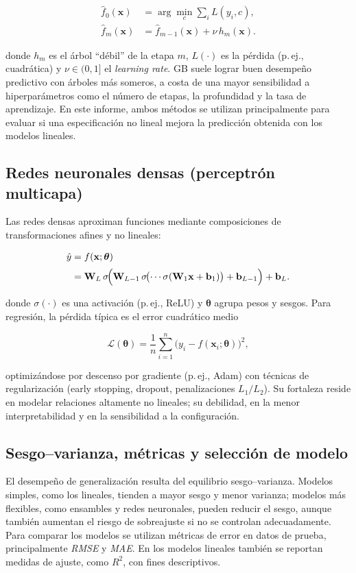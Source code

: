 \documentclass[10pt]{article}
\begin{document}
	\begin{align}
		\hat{f}_0(\mathbf{x}) &=
		\arg\min_c \sum_i L(y_i,c), \\[2pt]
		\hat{f}_m(\mathbf{x}) &=
		\hat{f}_{m-1}(\mathbf{x})
		+ \nu \, h_m(\mathbf{x}).
	\end{align}


	donde $h_m$ es el árbol ``débil'' de la etapa $m$, $L(\cdot)$ es la pérdida (p.\,ej., cuadrática) y $\nu\in(0,1]$ el \textit{learning rate}. GB suele lograr buen desempeño predictivo con árboles más someros, a costa de una mayor sensibilidad a hiperparámetros como el número de etapas, la profundidad y la tasa de aprendizaje. En este informe, ambos métodos se utilizan principalmente para evaluar si una especificación no lineal mejora la predicción obtenida con los modelos lineales.

	\subsection{Redes neuronales densas (perceptrón multicapa)}
	Las redes densas aproximan funciones mediante composiciones de transformaciones afines y no lineales:

	\begin{align}
		\hat{y}
		&= f(\mathbf{x};\boldsymbol{\theta})  \\[2pt]
		&= \mathbf{W}_L \,
		\sigma\!\Bigl(
		\mathbf{W}_{L-1}\,
		\sigma\!\bigl(\cdots
		\sigma(\mathbf{W}_1 \mathbf{x}+\mathbf{b}_1)
		\bigr)
		+\mathbf{b}_{L-1}
		\Bigr)
		+ \mathbf{b}_L.
	\end{align}

	donde $\sigma(\cdot)$ es una activación (p.\,ej., ReLU) y $\boldsymbol{\theta}$ agrupa pesos y sesgos. Para regresión, la pérdida típica es el error cuadrático medio

	\[
	\mathcal{L}(\boldsymbol{\theta})=\frac{1}{n}\sum_{i=1}^{n}\bigl(y_i - f(\mathbf{x}_i;\boldsymbol{\theta})\bigr)^2,
	\]

	optimizándose por descenso por gradiente (p.\,ej., Adam) con técnicas de regularización (early stopping, dropout, penalizaciones $L_1/L_2$). Su fortaleza reside en modelar relaciones altamente no lineales; su debilidad, en la menor interpretabilidad y en la sensibilidad a la configuración.

	\subsection{Sesgo–varianza, métricas y selección de modelo}
	El desempeño de generalización resulta del equilibrio sesgo--varianza. Modelos simples, como los lineales, tienden a mayor sesgo y menor varianza; modelos más flexibles, como ensambles y redes neuronales, pueden reducir el sesgo, aunque también aumentan el riesgo de sobreajuste si no se controlan adecuadamente. Para comparar los modelos se utilizan métricas de error en datos de prueba, principalmente \textit{RMSE} y \textit{MAE}. En los modelos lineales también se reportan medidas de ajuste, como $R^2$, con fines descriptivos.
\end{document}
